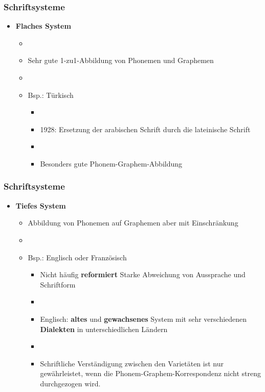 \begin{frame}
\frametitle{Schriftsysteme}

\begin{itemize}
	\item \textbf{Flaches System}
	
	\begin{itemize}
		\item[]
		\item Sehr gute 1-zu1-Abbildung von Phonemen und Graphemen
		\item[]
		\item Bsp.: Türkisch
		
		\begin{itemize}
			\item[]
			\item 1928: Ersetzung der arabischen Schrift durch die lateinische Schrift
			\item[]
			\item Besonders gute Phonem-Graphem-Abbildung
		\end{itemize}
	\end{itemize}
\end{itemize}
\end{frame}



\begin{frame}
\frametitle{Schriftsysteme}

\begin{itemize}
	\item \textbf{Tiefes System}
	
	\begin{itemize}
		\item Abbildung von Phonemen auf Graphemen aber mit Einschränkung
		\item[]
		\item Bsp.: Englisch oder Französisch
		
		\begin{itemize}
			\item Nicht häufig \textbf{reformiert} \ras Starke Abweichung von Aussprache und Schriftform
			\item[]			
			\item Englisch: \textbf{altes} und \textbf{gewachsenes} System mit sehr verschiedenen \textbf{Dialekten} in unterschiedlichen Ländern
			\item[]
			\item Schriftliche Verständigung zwischen den Varietäten ist nur gewährleistet, wenn die Phonem-Graphem-Korrespondenz nicht streng durchgezogen wird.
		\end{itemize}
	\end{itemize}
\end{itemize}


\end{frame}




